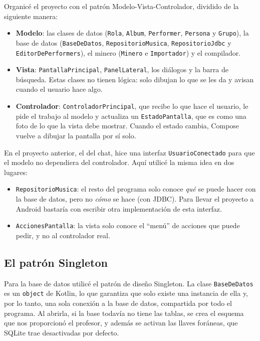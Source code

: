 \documentclass[12pt,letterpaper]{article}
\begin{document}
Organicé el proyecto con el patrón Modelo-Vista-Controlador, dividido de
la siguiente manera:

\begin{itemize}
    \item \textbf{Modelo}: las clases de datos (\texttt{Rola},
          \texttt{Album}, \texttt{Performer}, \texttt{Persona} y
          \texttt{Grupo}), la base de datos (\texttt{BaseDeDatos},
          \texttt{RepositorioMusica}, \texttt{RepositorioJdbc} y
          \texttt{EditorDePerformers}), el minero (\texttt{Minero} e
          \texttt{Importador}) y el compilador.
    \item \textbf{Vista}: \texttt{PantallaPrincipal},
          \texttt{PanelLateral}, los diálogos y la barra de búsqueda.
          Estas clases no tienen lógica: solo dibujan lo que se les da y
          avisan cuando el usuario hace algo.
    \item \textbf{Controlador}: \texttt{ControladorPrincipal}, que recibe
          lo que hace el usuario, le pide el trabajo al modelo y actualiza
          un \texttt{EstadoPantalla}, que es como una foto de lo que la
          vista debe mostrar. Cuando el estado cambia, Compose vuelve a
          dibujar la pantalla por sí solo.
\end{itemize}

En el proyecto anterior, el del chat, hice una interfaz
\texttt{UsuarioConectado} para que el modelo no dependiera del
controlador. Aquí utilicé la misma idea en dos lugares:

\begin{itemize}
    \item \texttt{RepositorioMusica}: el resto del programa solo conoce
          \emph{qué} se puede hacer con la base de datos, pero no
          \emph{cómo} se hace (con JDBC). Para llevar el proyecto a
          Android bastaría con escribir otra implementación de esta
          interfaz.
    \item \texttt{AccionesPantalla}: la vista solo conoce el ``menú'' de
          acciones que puede pedir, y no al controlador real.
\end{itemize}


\subsection{El patrón Singleton}

Para la base de datos utilicé el patrón de diseño Singleton. La clase
\texttt{BaseDeDatos} es un \texttt{object} de Kotlin, lo que garantiza que
solo existe una instancia de ella y, por lo tanto, una sola conexión a la
base de datos, compartida por todo el programa. Al abrirla, si la base
todavía no tiene las tablas, se crea el esquema que nos proporcionó el
profesor, y además se activan las llaves foráneas, que SQLite trae
desactivadas por defecto.
\end{document}
